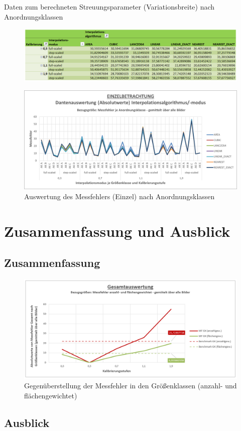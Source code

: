 \documentclass[
fontsize=10pt, 
listof = totoc,
parskip = half	
]{report}
\begin{document}
\begin{table}[H]
	\caption{Daten zum berechneten Streuungsparameter (Variationsbreite) nach Anordnungsklassen}
	\begin{figure}[H]
		\centering
		\includegraphics[width=\textwidth, height=\textheight, keepaspectratio]{pics/Tab_DA_Gesamt_Streu2_AKL}
		\label{tab:DAGesamtStreu2GAKL}
	\end{figure}
\end{table}

\begin{figure}[H]
	\centering
	\includegraphics[width=14cm, height=\textheight, keepaspectratio]{pics/DA_Einzel_Absolut_AKL}
	\caption{Auswertung des Messfehlers (Einzel) nach Anordnungsklassen}
	\label{fig:DAEinzelAbsolutAKL}
\end{figure}


\chapter{Zusammenfassung und Ausblick}

\section{Zusammenfassung}

\begin{figure}[H]
	\centering
	\includegraphics[width=14cm, height=\textheight, keepaspectratio]{pics/DA_Gesamt_GK_Kalib_Benchmark}
	\caption{Gegenüberstellung der Messfehler in den Größenklassen (anzahl- und flächengewichtet)}
	\label{fig:DAGesamtKalibBenchmark}
\end{figure}

\section{Ausblick}




\end{document}
